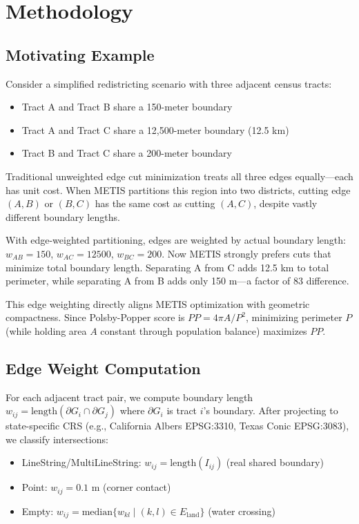 \documentclass[11pt,twocolumn]{article}
\begin{document}
\section{Methodology}

\subsection{Motivating Example}

Consider a simplified redistricting scenario with three adjacent census tracts:
\begin{itemize}
\item Tract A and Tract B share a 150-meter boundary
\item Tract A and Tract C share a 12,500-meter boundary (12.5 km)
\item Tract B and Tract C share a 200-meter boundary
\end{itemize}

Traditional unweighted edge cut minimization treats all three edges equally---each has unit cost. When METIS partitions this region into two districts, cutting edge $(A,B)$ or $(B,C)$ has the same cost as cutting $(A,C)$, despite vastly different boundary lengths.

With edge-weighted partitioning, edges are weighted by actual boundary length: $w_{AB} = 150$, $w_{AC} = 12500$, $w_{BC} = 200$. Now METIS strongly prefers cuts that minimize total boundary length. Separating A from C adds 12.5 km to total perimeter, while separating A from B adds only 150 m---a factor of 83 difference.

This edge weighting directly aligns METIS optimization with geometric compactness. Since Polsby-Popper score is $PP = 4\pi A / P^2$, minimizing perimeter $P$ (while holding area $A$ constant through population balance) maximizes $PP$.

\subsection{Edge Weight Computation}\label{sec:edge-weights}

For each adjacent tract pair, we compute boundary length $w_{ij} = \text{length}(\partial G_i \cap \partial G_j)$ where $\partial G_i$ is tract $i$'s boundary. After projecting to state-specific CRS (e.g., California Albers EPSG:3310, Texas Conic EPSG:3083), we classify intersections:
\begin{itemize}
\item LineString/MultiLineString: $w_{ij} = \text{length}(I_{ij})$ (real shared boundary)
\item Point: $w_{ij} = 0.1$ m (corner contact)
\item Empty: $w_{ij} = \text{median}\{w_{kl} \mid (k,l) \in E_{\text{land}}\}$ (water crossing)
\end{itemize}
\end{document}
